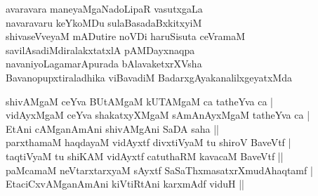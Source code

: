 \begin{entry}
\gl{}
\begin{shl}
avaravara maneyaMgaNadoLipaR vasutxgaLa\\
navaravaru keYkoMDu sulaBasadaBxkitxyiM\\
shivaseVveyaM mADutire noVDi haruSisuta ceVramaM\\
savilAsadiMdiralakxtatxlA pAMDayxnaqpa\\
navaniyoLagamarApurada bAlavaketxrXVsha\\
Bavanopupxtiraladhika viBavadiM BadarxgAyakanalilxgeyatxMda
\end{shl}
\end{entry}

\begin{entry}
\begin{shl}
shivAMgaM ceYva BUtAMgaM kUTAMgaM ca tatheYva ca |\\
vidAyxMgaM ceYva shakatxyXMgaM sAmAnAyxMgaM tatheYva ca |\\
EtAni cAMganAmAni shivAMgAni SaDA saha ||\\
parxthamaM haqdayaM vidAyxtf divxtiVyaM tu shiroV BaveVtf |\\
taqtiVyaM tu shiKAM vidAyxtf catuthaRM kavacaM BaveVtf ||\\
paMcamaM neVtarxtarxyaM sAyxtf SaSaThxmasatxrXmudAhaqtamf |\\
EtaciCxvAMganAmAni kiVtiRtAni karxmAdf viduH ||
\end{shl}

\end{entry}

